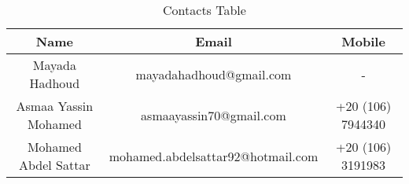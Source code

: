 \begin{table}[ht]
	\centering
	\renewcommand{\arraystretch}{1.5}
	\begin{tabular}[t]{c  c  c}
		Name & Email & Mobile \\
		\hline \hline
		Mayada Hadhoud & mayadahadhoud@gmail.com & -\\
		Asmaa Yassin Mohamed & asmaayassin70@gmail.com & +20 (106) 7944340\\
		Mohamed Abdel Sattar & mohamed.abdelsattar92@hotmail.com & +20 (106) 3191983
	\end{tabular}
	\caption{Contacts Table}
	\renewcommand{\arraystretch}{1.0}
\end{table}